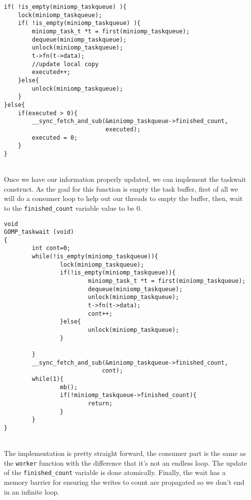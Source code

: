 \begin{lstlisting}[caption=Consumer with tracking of executed tasks, label=nconsumer]
if( !is_empty(miniomp_taskqueue) ){
    lock(miniomp_taskqueue);
    if( !is_empty(miniomp_taskqueue) ){
        miniomp_task_t *t = first(miniomp_taskqueue);
        dequeue(miniomp_taskqueue);
        unlock(miniomp_taskqueue);
        t->fn(t->data);
        //update local copy
        executed++;
    }else{
        unlock(miniomp_taskqueue);
    }
}else{
    if(executed > 0){
        __sync_fetch_and_sub(&miniomp_taskqueue->finished_count,
                             executed);
        executed = 0;
    }
}
\end{lstlisting}
\par ~\\
Once we have our information properly updated, we can implement the taskwait construct. As the goal for this function is empty the task buffer, first of all we will do a consumer loop to help out our threads to empty the buffer, then, wait to the \texttt{finished\_count} variable value to be 0.

\begin{lstlisting}
void
GOMP_taskwait (void)
{
        int cont=0;
        while(!is_empty(miniomp_taskqueue)){
                lock(miniomp_taskqueue);
                if(!is_empty(miniomp_taskqueue)){
                        miniomp_task_t *t = first(miniomp_taskqueue);
                        dequeue(miniomp_taskqueue);
                        unlock(miniomp_taskqueue);
                        t->fn(t->data);
                        cont++;
                }else{
                        unlock(miniomp_taskqueue);
                }

        }
        __sync_fetch_and_sub(&miniomp_taskqueue->finished_count,
                            cont);
        while(1){
                mb();
                if(!miniomp_taskqueue->finished_count){
                        return;
                }
        }
}

\end{lstlisting}

\par ~\\
The implementation is pretty straight forward, the consumer part is the same as the \texttt{worker} function with the difference that it's not an endless loop. The update of the \texttt{finished\_count} variable is done atomically. Finally, the wait has a memory barrier for ensuring the writes to count are propagated so we don't end in an infinite loop.

